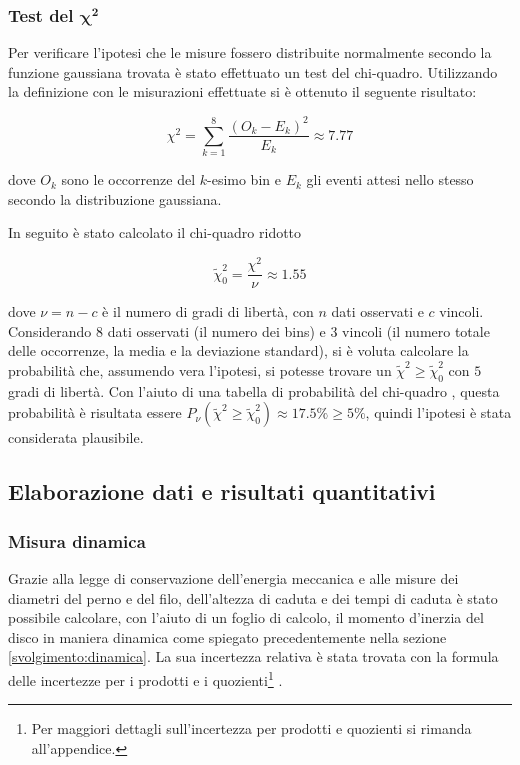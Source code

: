 \documentclass{article}
\begin{document}
\subsubsection{Test del $\boldsymbol{\chi ^2}$}
Per verificare l'ipotesi che le misure fossero distribuite normalmente secondo la funzione gaussiana trovata è stato effettuato un test del chi-quadro. Utilizzando la definizione con le misurazioni effettuate si è ottenuto	 il seguente risultato:

$$ \chi ^2 = \displaystyle\sum_{k=1}^8\frac{(O_k-E_k)^2}{E_k} \approx 7.77 $$

\noindent dove $O_k$ sono le occorrenze del $k$-esimo bin e $E_k$ gli eventi attesi nello stesso secondo la distribuzione gaussiana.

In seguito è stato calcolato il chi-quadro ridotto

$$ \widetilde{\chi} ^ 2_0 = \frac{\chi ^ 2}{\nu} \approx 1.55 $$

\noindent dove $ \nu = n - c $ è il numero di gradi di libertà, con $n$ dati osservati e $c$ vincoli. \\
Considerando $8$ dati osservati (il numero dei bins) e $3$ vincoli (il numero totale delle occorrenze, la media e la deviazione standard), si è voluta calcolare la probabilità che, assumendo vera l'ipotesi, si potesse trovare un $\widetilde{\chi} ^ 2 \geq \widetilde{\chi}^2_0$ con $5$ gradi di libertà. Con l'aiuto di una tabella di probabilità del chi-quadro \cite{taylor:chiquadro}, questa probabilità è risultata essere $P_{\nu}(\widetilde{\chi}^2 \geq \widetilde{\chi} ^ 2_0) \approx 17.5 \% \geq 5 \%$, quindi l'ipotesi è stata considerata plausibile.


\subsection{Elaborazione dati e risultati quantitativi}
\subsubsection{Misura dinamica}
Grazie alla legge di conservazione dell'energia meccanica e alle misure dei diametri del perno e del filo, dell'altezza di caduta e dei tempi di caduta è stato possibile calcolare, con l'aiuto di un foglio di calcolo, il momento d'inerzia del disco in maniera dinamica come spiegato precedentemente nella sezione \ref{svolgimento:dinamica}. La sua incertezza relativa è stata trovata con la formula delle incertezze per i prodotti e i quozienti\footnote{Per maggiori dettagli sull'incertezza per prodotti e quozienti si rimanda all'appendice.} \cite{taylor:prodotti}.
\end{document}
